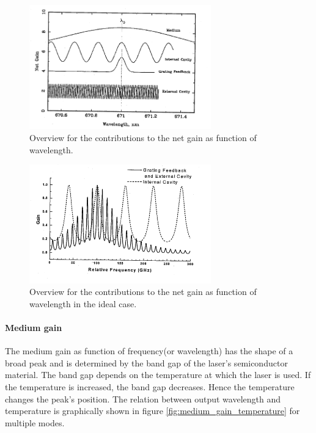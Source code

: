\FloatBarrier
\begin{figure}
  \includegraphics[width=0.7\textwidth]{gain_overview.png}
  \caption{Overview for the contributions to the net gain as function of
            wavelength.\cite{V60}}
  \label{fig:gain_overview}
\end{figure}
\FloatBarrier

\FloatBarrier
\begin{figure}
  \includegraphics[width=0.7\textwidth]{ideal_gain_overview.png}
  \caption{Overview for the contributions to the net gain as function of
            wavelength in the ideal case.\cite{V60}}
  \label{fig:ideal_gain_overview}
\end{figure}
\FloatBarrier


\paragraph{Medium gain}
The medium gain as function of frequency(or wavelength) has
the shape of a broad peak and is determined by the band gap of
the laser's semiconductor material.
The band gap depends on the temperature at which the laser is used.
If the temperature is increased, the band gap decreases.
Hence the temperature changes the peak's position.
The relation between output wavelength and
temperature is graphically shown
in figure \ref{fig:medium_gain_temperature}
for multiple modes.



